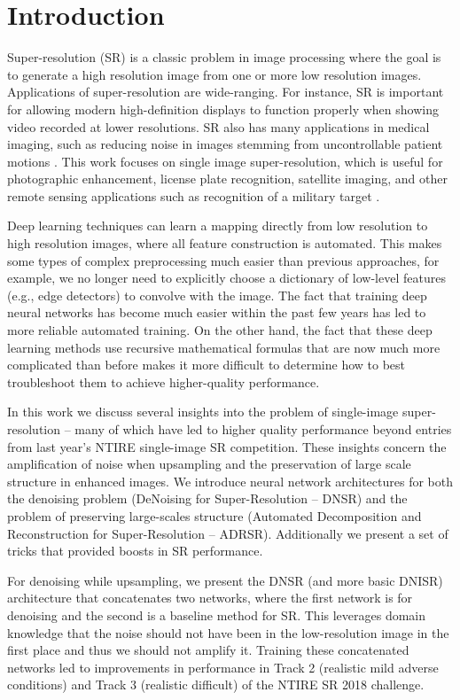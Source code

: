 \documentclass[10pt,twocolumn,letterpaper]{article}
\begin{document}
\section{Introduction}
Super-resolution (SR) is a classic problem in image processing where the goal is to generate a high resolution image from one or more low resolution images. Applications of super-resolution are wide-ranging. For instance, SR is important for allowing modern high-definition displays to function properly when showing video recorded at lower resolutions. SR also has many applications in medical imaging, such as reducing noise in images stemming from uncontrollable patient motions \cite{Robinson1}. This work focuses on single image super-resolution, which is useful for photographic enhancement, license plate recognition, satellite imaging, and other remote sensing applications such as recognition of a military target \cite{Yue2}. 

Deep learning techniques can learn a mapping directly from low resolution to high resolution images, where all feature construction is automated. This makes some types of complex preprocessing much easier than previous approaches, for example, we no longer need to explicitly choose a dictionary of low-level features (e.g., edge detectors) to convolve with the image. The fact that training deep neural networks has become much easier within the past few years has led to more reliable automated training. On the other hand, the fact that these deep learning methods use recursive mathematical formulas that are now much more complicated than before makes it more difficult to determine how to best troubleshoot them to achieve higher-quality performance.

In this work we discuss several insights into the problem of single-image super-resolution -- many of which have led to higher quality performance beyond entries from last year's NTIRE single-image SR competition. These insights concern the amplification of noise when upsampling and the preservation of large scale structure in enhanced images. We introduce neural network architectures for both the denoising problem (DeNoising for Super-Resolution -- DNSR) and the problem of preserving large-scales structure (Automated Decomposition and Reconstruction for Super-Resolution -- ADRSR). Additionally we present a set of tricks that provided boosts in SR performance. 

For denoising while upsampling, we present the DNSR (and more basic DNISR) architecture that concatenates two networks, where the first network is for denoising and the second is a baseline method for SR. This leverages domain knowledge that the noise should not have been in the low-resolution image in the first place and thus we should not amplify it.
Training these concatenated networks led to improvements in performance in Track 2 (realistic mild adverse conditions) and Track 3 (realistic difficult) of the NTIRE SR 2018 challenge. 
\end{document}
